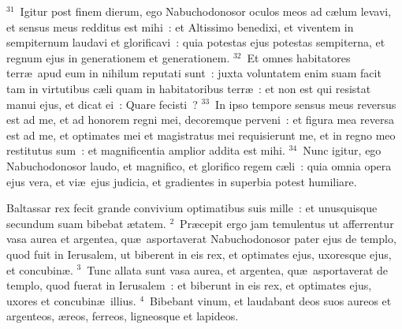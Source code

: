 ${}^{31}$~Igitur post finem dierum, ego Nabuchodonosor oculos meos ad c\ae lum levavi, et sensus meus redditus est mihi~: et Altissimo benedixi, et viventem in sempiternum laudavi et glorificavi~: quia potestas ejus potestas sempiterna, et regnum ejus in generationem et generationem.
${}^{32}$~Et omnes habitatores terr\ae\ apud eum in nihilum reputati sunt~: juxta voluntatem enim suam facit tam in virtutibus c\ae li quam in habitatoribus terr\ae~: et non est qui resistat manui ejus, et dicat ei~: Quare fecisti~?
${}^{33}$~In ipso tempore sensus meus reversus est ad me, et ad honorem regni mei, decoremque perveni~: et figura mea reversa est ad me, et optimates mei et magistratus mei requisierunt me, et in regno meo restitutus sum~: et magnificentia amplior addita est mihi.
${}^{34}$~Nunc igitur, ego Nabuchodonosor laudo, et magnifico, et glorifico regem c\ae li~: quia omnia opera ejus vera, et vi\ae\ ejus judicia, et gradientes in superbia potest humiliare.

\lettrine[lines=10,image=true,loversize=0.05,lraise=-0.03]{B}{}altassar rex fecit grande convivium optimatibus suis mille~: et unusquisque secundum suam bibebat \ae tatem.
${}^{2}$~Pr\ae cepit ergo jam temulentus ut afferrentur vasa aurea et argentea, qu\ae\ asportaverat Nabuchodonosor pater ejus de templo, quod fuit in Ierusalem, ut biberent in eis rex, et optimates ejus, uxoresque ejus, et concubin\ae .
${}^{3}$~Tunc allata sunt vasa aurea, et argentea, qu\ae\ asportaverat de templo, quod fuerat in Ierusalem~: et biberunt in eis rex, et optimates ejus, uxores et concubin\ae\ illius.
${}^{4}$~Bibebant vinum, et laudabant deos suos aureos et argenteos, \ae reos, ferreos, ligneosque et lapideos.


